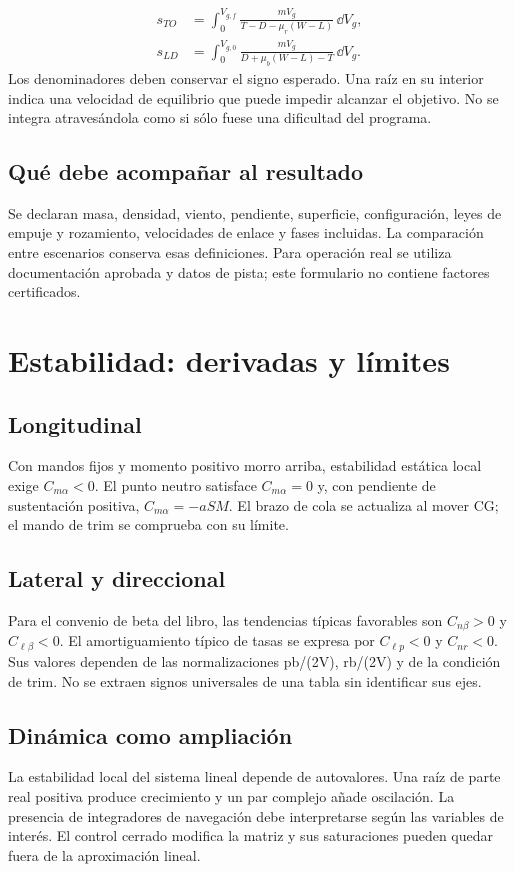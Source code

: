 \begin{align}
s_{TO}&=\int_0^{V_{g,f}}\frac{mV_g}{T-D-\mu_r(W-L)}\,\dd V_g,\\
s_{LD}&=\int_0^{V_{g,0}}\frac{mV_g}{D+\mu_b(W-L)-T}\,\dd V_g.
\end{align}
Los denominadores deben conservar el signo esperado. Una raíz en su interior indica una velocidad de equilibrio que puede impedir alcanzar el objetivo. No se integra atravesándola como si sólo fuese una dificultad del programa.

\section{Qué debe acompañar al resultado}
Se declaran masa, densidad, viento, pendiente, superficie, configuración, leyes de empuje y rozamiento, velocidades de enlace y fases incluidas. La comparación entre escenarios conserva esas definiciones. Para operación real se utiliza documentación aprobada y datos de pista; este formulario no contiene factores certificados.

\chapter{Estabilidad: derivadas y límites}
\section{Longitudinal}
Con mandos fijos y momento positivo morro arriba, estabilidad estática local exige $C_{m\alpha}<0$. El punto neutro satisface $C_{m\alpha}=0$ y, con pendiente de sustentación positiva, $C_{m\alpha}=-aSM$. El brazo de cola se actualiza al mover CG; el mando de trim se comprueba con su límite.

\section{Lateral y direccional}
Para el convenio de beta del libro, las tendencias típicas favorables son $C_{n\beta}>0$ y $C_{\ell\beta}<0$. El amortiguamiento típico de tasas se expresa por $C_{\ell p}<0$ y $C_{nr}<0$. Sus valores dependen de las normalizaciones pb/(2V), rb/(2V) y de la condición de trim. No se extraen signos universales de una tabla sin identificar sus ejes.

\section{Dinámica como ampliación}
La estabilidad local del sistema lineal depende de autovalores. Una raíz de parte real positiva produce crecimiento y un par complejo añade oscilación. La presencia de integradores de navegación debe interpretarse según las variables de interés. El control cerrado modifica la matriz y sus saturaciones pueden quedar fuera de la aproximación lineal.

